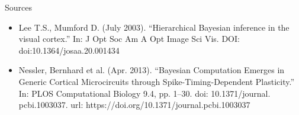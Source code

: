 \documentclass[aspectratio=169]{beamer}
\begin{document}
\begin{frame}{Sources}
    \begin{itemize}
    \item  Lee T.S., Mumford D. (July 2003). “Hierarchical Bayesian inference in the
 visual cortex.” In: J Opt Soc Am A Opt Image Sci Vis. DOI: doi:10.1364/josaa.20.001434
    \item Nessler, Bernhard et al. (Apr. 2013). “Bayesian Computation Emerges in
 Generic Cortical Microcircuits through Spike-Timing-Dependent Plasticity.” In: PLOS Computational Biology 9.4, pp. 1–30. doi: 10.1371/journal.
 pcbi.1003037. url: https://doi.org/10.1371/journal.pcbi.1003037
  \end{itemize}

\end{frame}
\end{document}
